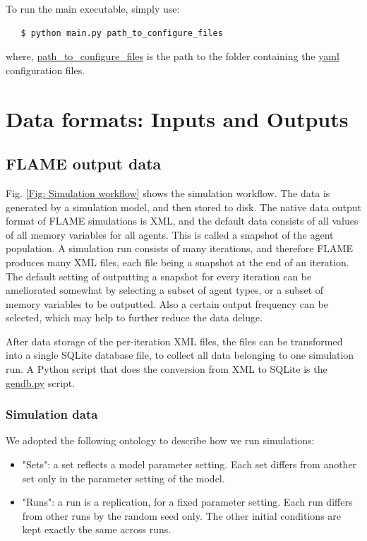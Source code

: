 \documentclass[10pt,a4paper]{article}
\begin{document}
To run the main executable, simply use:

\begin{lstlisting}
   $ python main.py path_to_configure_files
\end{lstlisting}

where, \url{path_to_configure_files} is the path to the folder containing the \url{yaml} configuration files.

\section{Data formats: Inputs and Outputs}
\label{Sec: Data formats}

\subsection{FLAME output data}
Fig. \ref{Fig: Simulation workflow} shows the simulation workflow. The data is generated by a simulation model, and then stored to disk. The native data output format of FLAME simulations is XML, and the default data consists of all values of all memory variables for all agents. This is called a snapshot of the agent population. A simulation run consists of many iterations, and therefore FLAME produces many XML files, each file being a snapshot at the end of an iteration. The default setting of outputting a snapshot for every iteration can be ameliorated somewhat by selecting a subset of agent types, or a subset of memory variables to be outputted. Also a certain output frequency can be selected, which may help to further reduce the data deluge.

After data storage of the per-iteration XML files, the files can be transformed into a single SQLite database file, to collect all data belonging to one simulation run.
A Python script that does the conversion from XML to SQLite is the \url{gendb.py} script.

\subsubsection{Simulation data}
We adopted the following ontology to describe how we run simulations:

\begin{itemize}
\item "Sets": a set reflects a model parameter setting. Each set differs from another set only in the parameter setting of the model.

\item "Runs": a run is a replication, for a fixed parameter setting. Each run differs from other runs by the random seed only. The other initial conditions are kept exactly the same across runs.
\end{itemize}
\end{document}
